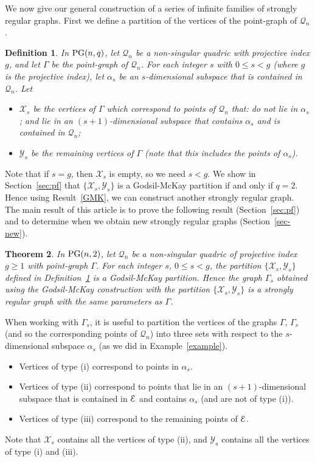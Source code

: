 \documentclass[12pt]{article}
\newtheorem{theorem}{Theorem}[section]
\newtheorem{definition}[theorem]{Definition}
\newcommand{\X}{\mathcal X}
\newcommand{\Y}{\mathcal Y}
\newcommand\E{{\cal E}}
\newcommand{\Q}{\mathscr Q}
\newcommand\PG{{\rm PG}}
\newcommand{\Label}{\label}
\newcommand\TODO[1]{{\color{Purple} #1}}
\begin{document}
We now give our general construction of a series of infinite families of strongly regular  graphs. First we define a partition of the vertices  of the point-graph of $\Q_n$.


\begin{definition}\Label{def-partition} In $\PG(n,q)$, let $\Q_n$ be a non-singular quadric  with projective index $g$, and let $\Gamma$ be the point-graph of $\Q_n$.
 For each integer $s$ with $0\leq s< g$ \TODO{(where $g$ is the projective index)}, let $\alpha_s$ be an $s$-dimensional subspace  that is contained in ${\Q_n}$. Let
\begin{itemize}
\item $\X_s$ be the vertices of  $\Gamma$ which correspond to points of $\Q_n$ that:  do not lie in $\alpha_s$; and lie in an $(s+1)$-dimensional subspace that contains $\alpha_s$ and  is contained in $\Q_n$;
\item $\Y_s$  be the remaining vertices of  $\Gamma$   (note  that this includes the points of $\alpha_s$). 
\end{itemize}
\end{definition}
Note that if $s=g$, then $\X_s$ is empty, so we  need $s<g$.
We  show in Section~\ref{sec:pf} that  $\{\X_s,\Y_s\}$  is a Godsil-McKay partition if and only if $q=2$. Hence using Result~\ref{GMK}, we can construct another strongly regular graph.
The main result of this article is to prove the following result (Section~\ref{sec:pf}) and to determine when we obtain new strongly regular graphs (Section~\ref{sec-new}).


\begin{theorem}\Label{main-thm} In $\PG(n,2)$, let $\Q_n$ be a non-singular quadric of projective index $g\geq1$ with point-graph $\Gamma$. For each integer $s$, $0\leq s <g$,  the partition  $\{\X_s,\Y_s\}$ defined in Definition~\ref{def-partition} is a Godsil-McKay partition. Hence the graph $\Gamma_{s}$ obtained using the  Godsil-McKay construction with the partition $\{\X_s,\Y_s\}$ is a strongly regular graph with the same parameters as $\Gamma$.
\end{theorem}





When working with $\Gamma_s$, it is useful to partition the vertices of the graphs $\Gamma$, $\Gamma_s$ (and so the corresponding points of $\Q_n$) into three sets with respect to the $s$-dimensional subspace $\alpha_s$ (as we did in Example~\ref{example}).
\begin{itemize}
\item Vertices of type (i) correspond to points in $\alpha_s$.
\item Vertices of type (ii) correspond to points that lie in an $(s+1)$-dimensional subspace that is contained in $\E$ and contains $\alpha_s$ (and are not of type (i)). 
\item Vertices of type (iii) correspond to the remaining points of $\E$.
\end{itemize}
Note that $\X_s$ contains all the vertices of type (ii), and $\Y_s$ contains all the vertices of type (i) and (iii).
\end{document}
